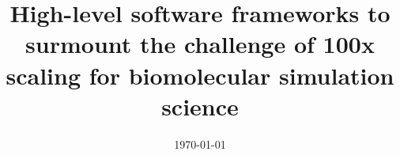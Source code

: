 \documentclass[10pt,letterpaper,draft]{article}
\date{\today}
\begin{document}
\title{\bf High-level software frameworks to surmount the challenge of 100x
  scaling for biomolecular simulation science}

\maketitle





\renewcommand{\thepage}{\arabic{page}}

\end{document}
